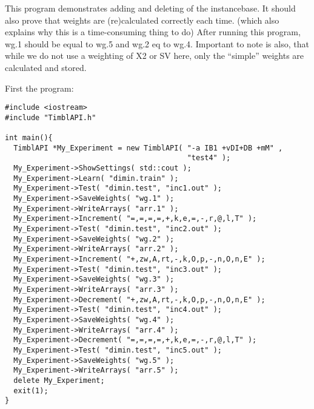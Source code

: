 This program demonstrates adding and deleting of the instancebase.  It
should also prove that weights are (re)calculated correctly each
time. (which also explains why this is a time-consuming thing to do)
After running this program, wg.1 should be equal to wg.5 and wg.2 eq
to wg.4. Important to note is also, that while we do not use a
weighting of X2 or SV here, only the ``simple'' weights are calculated
and stored.

First the program: 

\begin{footnotesize}
\begin{verbatim}
#include <iostream>
#include "TimblAPI.h"

int main(){
  TimblAPI *My_Experiment = new TimblAPI( "-a IB1 +vDI+DB +mM" , 
                                          "test4" );
  My_Experiment->ShowSettings( std::cout );
  My_Experiment->Learn( "dimin.train" );  
  My_Experiment->Test( "dimin.test", "inc1.out" );
  My_Experiment->SaveWeights( "wg.1" );  
  My_Experiment->WriteArrays( "arr.1" );  
  My_Experiment->Increment( "=,=,=,=,+,k,e,=,-,r,@,l,T" );  
  My_Experiment->Test( "dimin.test", "inc2.out" );
  My_Experiment->SaveWeights( "wg.2" );  
  My_Experiment->WriteArrays( "arr.2" );  
  My_Experiment->Increment( "+,zw,A,rt,-,k,O,p,-,n,O,n,E" );  
  My_Experiment->Test( "dimin.test", "inc3.out" );
  My_Experiment->SaveWeights( "wg.3" );  
  My_Experiment->WriteArrays( "arr.3" );  
  My_Experiment->Decrement( "+,zw,A,rt,-,k,O,p,-,n,O,n,E" );  
  My_Experiment->Test( "dimin.test", "inc4.out" );
  My_Experiment->SaveWeights( "wg.4" );  
  My_Experiment->WriteArrays( "arr.4" );  
  My_Experiment->Decrement( "=,=,=,=,+,k,e,=,-,r,@,l,T" );  
  My_Experiment->Test( "dimin.test", "inc5.out" );
  My_Experiment->SaveWeights( "wg.5" );  
  My_Experiment->WriteArrays( "arr.5" );  
  delete My_Experiment;
  exit(1);
}
\end{verbatim}
\end{footnotesize}


